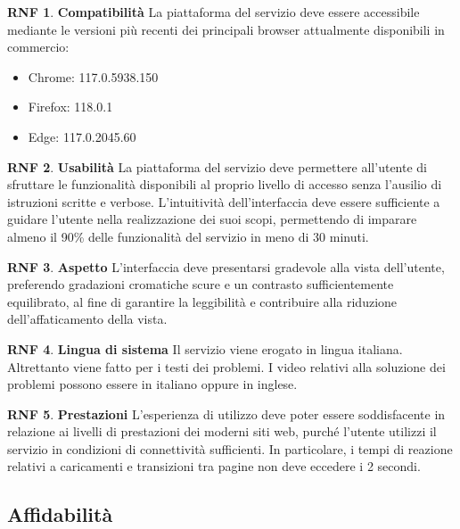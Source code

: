 \documentclass[11pt, a4paper]{article}
\theoremstyle{definition}
\newtheorem{nonfuncreq}{RNF} %
\begin{document}
\begin{nonfuncreq}
\label{compatibility}
\textbf{Compatibilità }
La piattaforma del servizio deve essere accessibile mediante le versioni
più recenti dei principali browser attualmente disponibili in commercio:
\begin{itemize}
    \item Chrome: 117.0.5938.150
    \item Firefox: 118.0.1
    \item Edge: 117.0.2045.60
\end{itemize}
\end{nonfuncreq}


\begin{nonfuncreq}
\textbf{Usabilità }
La piattaforma del servizio deve permettere all'utente di sfruttare le
funzionalità disponibili al proprio livello di accesso senza l'ausilio di
istruzioni scritte e verbose. L'intuitività dell'interfaccia deve essere
sufficiente a guidare l'utente nella realizzazione dei suoi scopi,
permettendo di imparare almeno il 90\% delle funzionalità del servizio in
meno di 30 minuti. 
\end{nonfuncreq}

\begin{nonfuncreq}
\textbf{Aspetto }
L'interfaccia deve presentarsi gradevole alla vista dell'utente, preferendo
gradazioni cromatiche scure e un contrasto sufficientemente equilibrato,
al fine di garantire la leggibilità e contribuire alla riduzione
dell'affaticamento della vista.
\end{nonfuncreq}

\begin{nonfuncreq}
\textbf{Lingua di sistema }
Il servizio viene erogato in lingua italiana. Altrettanto viene fatto per i
testi dei problemi. I video relativi alla soluzione dei problemi possono
essere in italiano oppure in inglese.
\end{nonfuncreq}

\begin{nonfuncreq}
\textbf{Prestazioni }
L'esperienza di utilizzo deve poter essere soddisfacente in relazione
ai livelli di prestazioni dei moderni siti web, purché l'utente utilizzi
il servizio in condizioni di connettività sufficienti. In particolare,
i tempi di reazione relativi a caricamenti e transizioni tra pagine non
deve eccedere i 2 secondi.
\end{nonfuncreq}

\subsection{Affidabilità}
\end{document}

